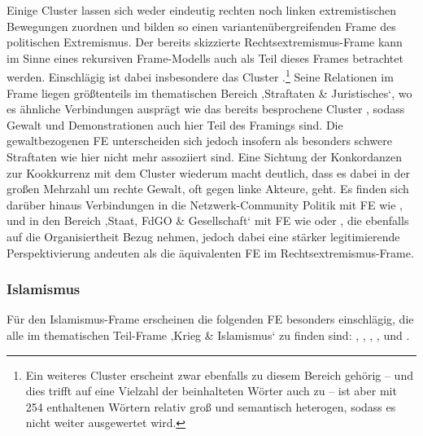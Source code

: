 Einige Cluster lassen sich weder eindeutig rechten noch linken extremistischen Bewegungen zuordnen und bilden so einen variantenübergreifenden Frame des politischen Extremismus. Der bereits skizzierte Rechtsextremismus-Frame kann im Sinne eines rekursiven Frame-Modells auch als Teil dieses Frames betrachtet werden. Einschlägig ist dabei insbesondere das Cluster .\footnote{Ein weiteres Cluster  erscheint zwar ebenfalls zu diesem Bereich gehörig -- und dies trifft auf eine Vielzahl der beinhalteten Wörter auch zu -- ist aber mit 254 enthaltenen Wörtern relativ groß und semantisch heterogen, sodass es nicht weiter ausgewertet wird.} Seine Relationen im Frame liegen größtenteils im thematischen Bereich ‚Straftaten \& Juristisches`, wo es ähnliche Verbindungen ausprägt wie das bereits besprochene Cluster , sodass Gewalt und Demonstrationen auch hier Teil des Framings sind. Die gewaltbezogenen FE unterscheiden sich jedoch insofern als besonders schwere Straftaten wie  hier nicht mehr assoziiert sind. Eine Sichtung der Konkordanzen zur Kookkurrenz mit dem Cluster  wiederum macht deutlich, dass es dabei in der großen Mehrzahl um rechte Gewalt, oft gegen linke Akteure, geht. Es finden sich darüber hinaus Verbindungen in die Netzwerk-Community Politik mit FE wie ,  und in den Bereich ‚Staat, FdGO \& Gesellschaft` mit FE wie  oder , die ebenfalls auf die Organisiertheit Bezug nehmen, jedoch dabei eine stärker legitimierende Perspektivierung andeuten als die äquivalenten FE im Rechtsextremismus-Frame.

\subsubsection{Islamismus}\label{islamismus}

Für den Islamismus-Frame erscheinen die folgenden FE besonders einschlägig, die alle im thematischen Teil-Frame ‚Krieg \& Islamismus` zu finden sind:  , , , ,  und  .

